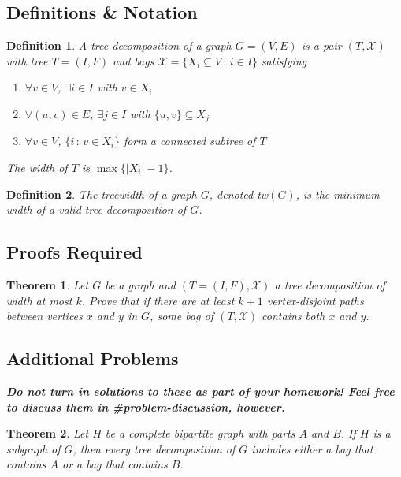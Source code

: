 \documentclass{article}
\newtheorem*{theorem}{Theorem}
\newtheorem{definition}{Definition}
\begin{document}
\subsection*{Definitions \& Notation}
\begin{definition}
    A \emph{tree decomposition} of a graph $G = (V,E)$
    is a pair $(T, \mathcal{X})$ with tree $T = (I,F)$
    and bags $\mathcal{X} = \{X_i \subseteq V \,:\, i \in I \}$
    satisfying
    \begin{enumerate}
      \item $\forall v \in V$, $\exists i \in I$ with $v \in X_i$
      \item $\forall (u,v) \in E$, $\exists j \in I$ with $\{u,v\} \subseteq X_j$
      \item $\forall v \in V$, $\{i \,:\, v \in X_i\}$ form a connected subtree of $T$
    \end{enumerate}
    The \emph{width} of $T$ is $\max\{|X_i| - 1\}$.
\end{definition}

\begin{definition} The \emph{treewidth} of a graph $G$, denoted tw$(G)$, is the minimum
  width of a valid tree decomposition of $G$.
\end{definition}


\subsection*{Proofs Required}

\begin{theorem} Let $G$ be a graph and $(T = (I,F), \mathcal{X})$ a tree decomposition
  of width at most $k$. Prove that if there are at least $k+1$ vertex-disjoint
  paths between vertices $x$ and $y$ in $G$, some bag of $(T,\mathcal{X})$ contains
  both $x$ and $y$.
\end{theorem}

\subsection*{Additional Problems}
\textbf{\textit{Do not turn in solutions to these as part of your homework! Feel free
to discuss them in \#problem-discussion, however.}}
\begin{theorem} Let $H$ be a complete bipartite graph with parts $A$ and $B$. If $H$
  is a subgraph of $G$, then every tree decomposition of $G$ includes either a bag
  that contains $A$ or a bag that contains $B$.
\end{theorem}
\end{document}

